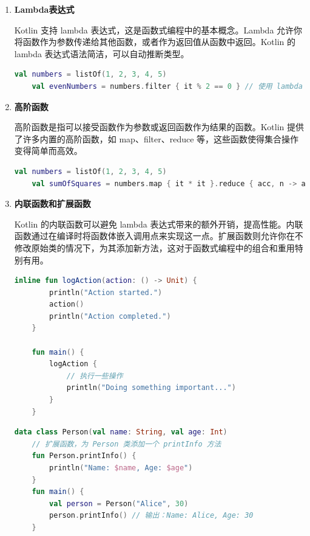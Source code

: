 \documentclass[main.tex]{subfiles}
\begin{document}
\begin{enumerate}
    \item \textbf{Lambda表达式}
    
    Kotlin 支持 lambda 表达式，这是函数式编程中的基本概念。Lambda 允许你将函数作为参数传递给其他函数，或者作为返回值从函数中返回。Kotlin 的 lambda 表达式语法简洁，可以自动推断类型。

    \begin{lstlisting}[language=Kotlin]
    val numbers = listOf(1, 2, 3, 4, 5)
    val evenNumbers = numbers.filter { it % 2 == 0 } // 使用 lambda 过滤偶数
    \end{lstlisting}

    \item \textbf{高阶函数}

    高阶函数是指可以接受函数作为参数或返回函数作为结果的函数。Kotlin 提供了许多内置的高阶函数，如 map、filter、reduce 等，这些函数使得集合操作变得简单而高效。
    \begin{lstlisting}[language=Kotlin]
    val numbers = listOf(1, 2, 3, 4, 5)
    val sumOfSquares = numbers.map { it * it }.reduce { acc, n -> acc + n }
    \end{lstlisting}

    \item \textbf{内联函数和扩展函数}

    Kotlin 的内联函数可以避免 lambda 表达式带来的额外开销，提高性能。内联函数通过在编译时将函数体嵌入调用点来实现这一点。扩展函数则允许你在不修改原始类的情况下，为其添加新方法，这对于函数式编程中的组合和重用特别有用。
    \begin{lstlisting}[language=Kotlin]
    inline fun logAction(action: () -> Unit) {
        println("Action started.")
        action()
        println("Action completed.")
    }
    
    fun main() {
        logAction {
            // 执行一些操作
            println("Doing something important...")
        }
    }
    \end{lstlisting}
    \begin{lstlisting}[language=Kotlin]
    data class Person(val name: String, val age: Int)
    // 扩展函数，为 Person 类添加一个 printInfo 方法
    fun Person.printInfo() {
        println("Name: $name, Age: $age")
    }
    fun main() {
        val person = Person("Alice", 30)
        person.printInfo() // 输出：Name: Alice, Age: 30
    }
    \end{lstlisting}
\end{enumerate}
\end{document}
